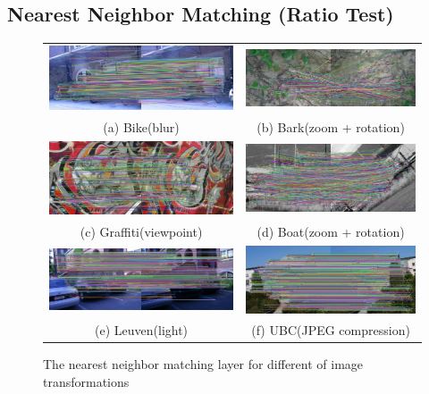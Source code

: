 \subsection {Nearest Neighbor Matching (Ratio Test)}
\begin{figure}[H]
\begin{tabular}{cc}
  \includegraphics[width=75mm]{figures/bike_nn_1_3} &  \includegraphics[width=75mm]{figures/barks_nn_1_3} \\
(a) Bike(blur) & (b) Bark(zoom + rotation) \\[6pt]
 \includegraphics[width=75mm]{figures/graffiti_nn_1_3} &  \includegraphics[width=75mm]{figures/boat_nn_1_3} \\
(c) Graffiti(viewpoint) & (d) Boat(zoom + rotation) \\[6pt]
 \includegraphics[width=75mm]{figures/leuven_nn_1_3} &  \includegraphics[width=75mm]{figures/ubc_nn_1_3} \\
(e) Leuven(light) & (f) UBC(JPEG compression) \\[6pt]
\end{tabular}
\caption{The nearest neighbor matching layer for different of image transformations}\label{fig:nearest_neighbor_matching}
\end{figure}

